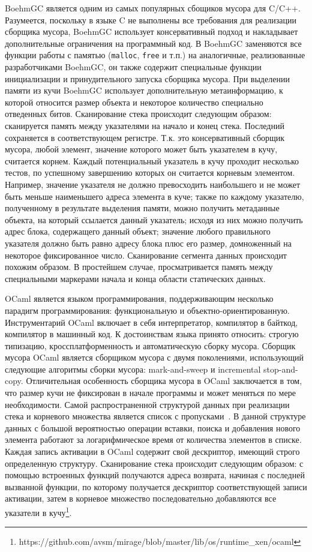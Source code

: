 BoehmGC является одним из самых популярных сбощиков мусора для C/C++. Разумеется, поскольку в языке C не выполнены все требования для 
реализации сборщика мусора, BoehmGC использует консервативный подход и накладывает дополнительные ограничения на программный код. 
В BoehmGC заменяются все функции работы с памятью (\texttt{malloc}, \texttt{free} и т.п.) на аналогичные, реализованные разработчиками 
BoehmGC, он также содержит специальные функции инициализации и принудительного запуска сборщика мусора. При выделении памяти из кучи 
BoehmGC использует дополнительную метаинформацию, к которой относится размер объекта и некоторое количество специально отведенных битов.
Сканирование стека происходит следующим образом: сканируется память между указателями на начало и конец стека. Последний сохраняется в 
соответствующем регистре. Т.к. это консервативный сборщик мусора, любой элемент, значение которого может быть указателем в кучу, считается 
корнем. Каждый потенциальный указатель в кучу проходит несколько тестов, по успешному завершению которых он считается корневым элементом. 
Например, значение указателя не должно превосходить наибольшего и не может быть меньше наименьшего адреса элемента в куче; также по каждому 
указателю, полученному в результате выделения памяти, можно получить метаданные объекта, на который ссылается данный указатель; исходя из них 
можно получить адрес блока, содержащего данный объект; значение любого правильного указателя должно быть равно адресу блока плюс его размер, 
домноженный на некоторое фиксированное число. Сканирование сегмента данных происходит похожим образом. В простейшем случае, просматривается 
память между специальными маркерами начала и конца области статических данных.

OCaml является языком программирования, поддерживающим несколько парадигм программирования: функциональную и
объектно-ориентированную. Инструментарий OCaml включает в себя интерпретатор, компилятор в байткод, компилятор в
машинный код. К достоинствам языка принято относить: строгую типизацию, кроссплатформенность и автоматическую
сборку мусора. Сборщик мусора OCaml является сборщиком мусора с двумя поколениями, использующий следующие
алгоритмы сборки мусора: mark-and-sweep и incremental stop-and-copy. Отличительная особенность сборщика мусора
в OCaml заключается в том, что размер кучи не фиксирован в начале программы и может меняться по мере необходимости.
Самой распространенной структурой данных при реализации стека и корневого множества является список с пропусками~\cite{ref4}.
В данной структуре данных с большой вероятностью операции вставки, поиска и добавления нового элемента работают за логарифмическое 
время от количества элементов в списке. Каждая запись активации в OCaml содержит свой дескриптор, имеющий строго определенную структуру. 
Сканирование стека происходит следующим образом: с помощью встроенных функций получаются адреса возврата, начиная с последней вызванной функции, 
по которому получается дескриптор соответствующей записи активации, затем в корневое множество последовательно добавляются все указатели в 
кучу\footnote{https://github.com/avsm/mirage/blob/master/lib/os/runtime\_xen/ocaml}.



